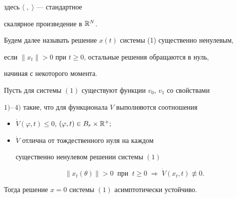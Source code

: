 здесь $\langle\;,\;\rangle$ --- стандартное 


скалярное произведение в $\Bbb{R}^N$.


Будем далее называть решение $x(t)$ системы (1) существенно ненулевым,


если $\|x_t\|>0$ при $t\geqslant0$, остальные решения обращаются в нуль,


начиная с некоторого момента.





\begin{thmnonum}


Пусть для системы $(1)$ существуют функции $v_0$, $v_1$ со свойствами


$1)$--\,$4)$ такие, что для функционала $V$ выполняются соотношения


\begin{itemize}


\item[$1^\circ$.]


$\Dot V(\varphi,t)\leqslant0$, $(\varphi,t)\in B_r\times\Bbb{R}^+;$


\item[$2^\circ$.] $\Dot V$ отлична от тождественного нуля на каждом


существенно ненулевом решении системы $(1)$


$$


\|x_t(\theta)\|>0\ \text{ при }\ t\geqslant0\;\Rightarrow\;


\Dot V(x_t,t)\not\equiv0.


$$


\end{itemize}


Тогда решение $x=0$ системы $(1)$ асимптотически устойчиво.


\end{thmnonum}





